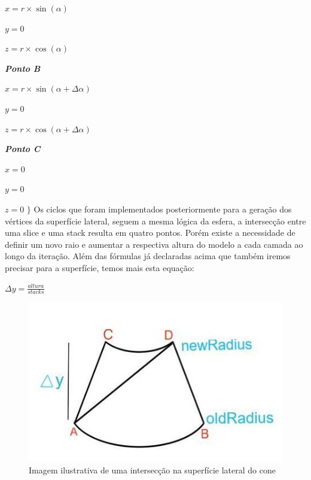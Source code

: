 \documentclass[12pt]{article}
\begin{document}
\par$x = r\times\sin(\alpha)$\newline
\par$y = 0$ \newline
\par$z = r\times\cos(\alpha)$ \newline\newline
\par\textit{\textbf{Ponto B}} \newline
\par$x = r\times\sin(\alpha + \Delta\alpha)$ \newline
\par$y = 0$ \newline
\par$z = r\times\cos(\alpha + \Delta\alpha)$  \newline\newline
\par\textit{\textbf{Ponto C}} \newline
\par$x = 0$\newline
\par$y = 0$ \newline
\par$z = 0$ \newline
$\}$
\newline\newline
Os ciclos que foram implementados posteriormente para a geração dos vértices da superfície lateral, seguem a mesma lógica da esfera,
a intersecção entre uma slice e uma stack resulta em quatro pontos. Porém existe a necessidade de definir um novo raio e aumentar a respectiva altura do modelo a cada
camada ao longo da iteração. Além das fórmulas já declaradas acima que também iremos precisar para a superfície, temos mais esta equação:\newline\newline
\par$\Delta y = \frac{altura}{stacks}$\newline
\begin{figure}[H]
\centering\includegraphics[scale=0.50]{coneAux} 
\caption{\label{fig:controller}Imagem ilustrativa de uma intersecção na superfície lateral do cone}
\end{figure}
\end{document}
